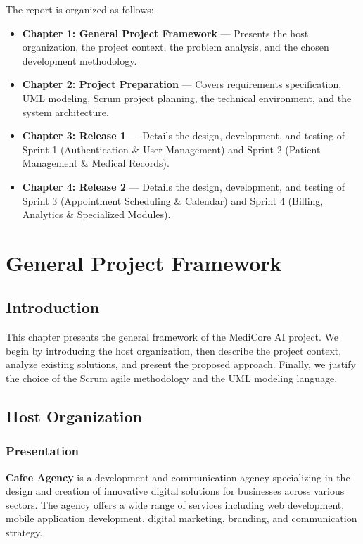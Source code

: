 \documentclass[12pt,a4paper,oneside]{report}
\begin{document}
The report is organized as follows:

\begin{itemize}
    \item \textbf{Chapter 1: General Project Framework} — Presents the host organization, the project context, the problem analysis, and the chosen development methodology.
    \item \textbf{Chapter 2: Project Preparation} — Covers requirements specification, UML modeling, Scrum project planning, the technical environment, and the system architecture.
    \item \textbf{Chapter 3: Release 1} — Details the design, development, and testing of Sprint 1 (Authentication \& User Management) and Sprint 2 (Patient Management \& Medical Records).
    \item \textbf{Chapter 4: Release 2} — Details the design, development, and testing of Sprint 3 (Appointment Scheduling \& Calendar) and Sprint 4 (Billing, Analytics \& Specialized Modules).
\end{itemize}


\chapter{General Project Framework}

\section{Introduction}

This chapter presents the general framework of the MediCore AI project. We begin by introducing the host organization, then describe the project context, analyze existing solutions, and present the proposed approach. Finally, we justify the choice of the Scrum agile methodology and the UML modeling language.

\section{Host Organization}

\subsection{Presentation}
\textbf{Cafee Agency} is a development and communication agency specializing in the design and creation of innovative digital solutions for businesses across various sectors. The agency offers a wide range of services including web development, mobile application development, digital marketing, branding, and communication strategy.
\end{document}
